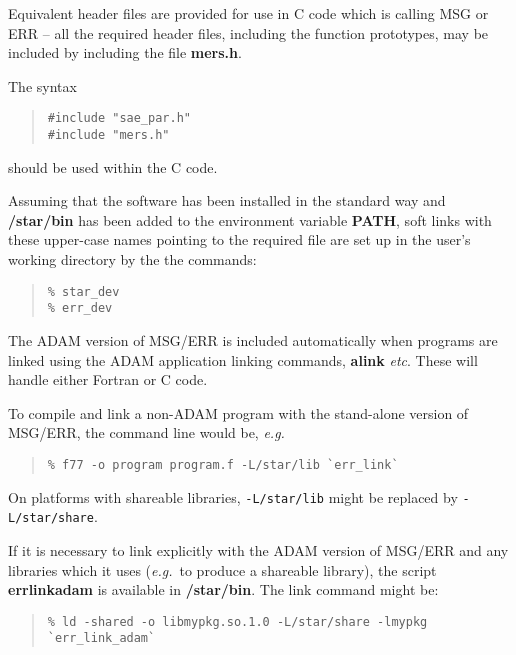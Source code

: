 \documentclass[twoside,11pt]{article}
\renewcommand{\_}{\texttt{\symbol{95}}}
\begin{document}
Equivalent header files are provided for use in C code which is calling MSG
or ERR -- all the required header files, including the function prototypes,
may be included by including the file \textbf{mers.h}.

The syntax
\begin{quote}
\begin{verbatim}
#include "sae_par.h"
#include "mers.h"
\end{verbatim}
\end{quote}
should be used within the C code.

Assuming that the software has been installed in the standard way and
\textbf{/star/bin} has been added to the environment variable
\textbf{PATH}, soft links with these upper-case names pointing to the required 
file are set up in the user's working directory by the the commands:
\begin {quote}
\begin{small}
\begin{verbatim}
% star_dev
% err_dev
\end{verbatim}
\end{small}
\end {quote}

The ADAM version of MSG/ERR is included automatically when
programs are linked using the ADAM application linking commands, \textbf{alink} 
\textit{etc}. These will handle either Fortran or C code.

To compile and link a non-ADAM program with the stand-alone version of
MSG/ERR, the command line would be, \textit{e.g.}
\begin {quote}
\begin{small}
\begin{verbatim}
% f77 -o program program.f -L/star/lib `err_link` 
\end{verbatim}
\end{small}
\end {quote}

On platforms with shareable libraries, \texttt{-L/star/lib} might be replaced 
by \texttt{-L/star/share}.

If it is necessary to link explicitly with the ADAM version of MSG/ERR and any
libraries which it uses (\textit{e.g.}\ to produce a shareable library), the 
script \textbf{err\_link\_adam} is available in \textbf{/star/bin}. 
The link command might be:
\begin {quote}
\begin {small}
\begin{verbatim}
% ld -shared -o libmypkg.so.1.0 -L/star/share -lmypkg `err_link_adam`
\end{verbatim}
\end {small}
\end {quote}
\end{document}
